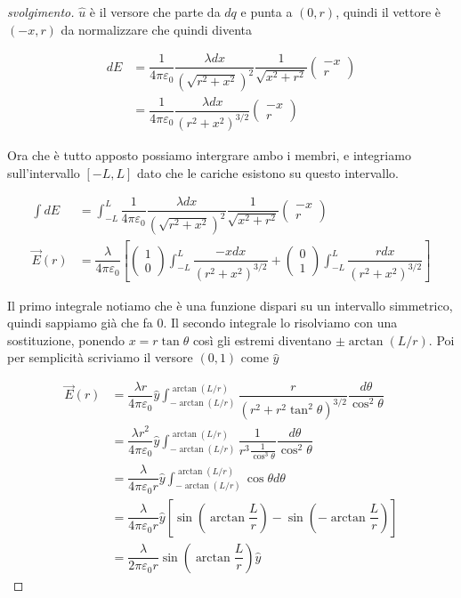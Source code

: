 \documentclass{rapport}
\begin{document}
\begin{proof}[svolgimento]
$\hat{u}$ è il versore che parte da $dq$ e punta a $(0, r)$, quindi il vettore è $(-x, r)$ da normalizzare che quindi diventa 

\begin{align*}
dE &= \dfrac{1}{4\pi\varepsilon_0} \dfrac{\lambda dx}{(\sqrt{r^2+x^2})^2} \dfrac{1}{\sqrt{x^2+r^2}} \begin{pmatrix}
  -x \\
  r
\end{pmatrix} \\[0.1cm]
&= \dfrac{1}{4\pi\varepsilon_0} \dfrac{\lambda dx}{(r^2+x^2)^{3/2}}\begin{pmatrix}
  -x \\
  r
\end{pmatrix}
\end{align*}

Ora che è tutto apposto possiamo intergrare ambo i membri, e integriamo sull'intervallo $[-L, L]$ dato che le cariche esistono su questo intervallo.

\begin{align*}
\int dE &= \int_{-L}^{L}\dfrac{1}{4\pi\varepsilon_0} \dfrac{\lambda dx}{(\sqrt{r^2+x^2})^2} \dfrac{1}{\sqrt{x^2+r^2}} \begin{pmatrix}
  -x \\
  r
\end{pmatrix} \\[0.1cm]
\vec{E}(r) &= \dfrac{\lambda}{4\pi\varepsilon_0} \left[\begin{pmatrix}
  1 \\
  0
\end{pmatrix}\int_{-L}^{L}  \dfrac{-x dx}{(r^2+x^2)^{3/2}} + \begin{pmatrix}
  0 \\
  1
\end{pmatrix}\int_{-L}^{L}  \dfrac{r dx}{(r^2+x^2)^{3/2}}\right]
\end{align*}

\newpage
Il primo integrale notiamo che è una funzione dispari su un intervallo simmetrico, quindi sappiamo già che fa 0. Il secondo integrale lo risolviamo con una sostituzione, ponendo $x=r\tan \theta$ così gli estremi diventano $\pm\arctan(L/r)$. Poi per semplicità scriviamo il versore $(0, 1)$ come $\hat{y}$

\begin{align*}
  \vec{E}(r) &= \dfrac{\lambda r }{4\pi\varepsilon_0} \hat{y} \int_{-\arctan(L/r)}^{\arctan(L/r)}\dfrac{r}{(r^2+r^2\tan^2\theta )^{3/2}} \dfrac{d\theta}{\cos^2 \theta} \\
 &= \dfrac{\lambda r^2 }{4\pi\varepsilon_0} \hat{y}  \int_{-\arctan(L/r)}^{\arctan(L/r)}\dfrac{1}{r^3 \frac{1}{\cos^3\theta}} \dfrac{d\theta}{\cos^2 \theta} \\
 &= \dfrac{\lambda  }{4\pi\varepsilon_0 r} \hat{y} \int_{-\arctan(L/r)}^{\arctan(L/r)}\cos\theta d\theta \\
 &= \dfrac{\lambda  }{4\pi\varepsilon_0 r} \hat{y} \left[\sin\left(\arctan\dfrac{L}{r}\right)-\sin\left(-\arctan\dfrac{L}{r}\right)\right] \\
 &= \dfrac{\lambda  }{2\pi\varepsilon_0 r}  \sin\left(\arctan\dfrac{L}{r}\right) \hat{y}
\end{align*}


\end{proof}
\end{document}
